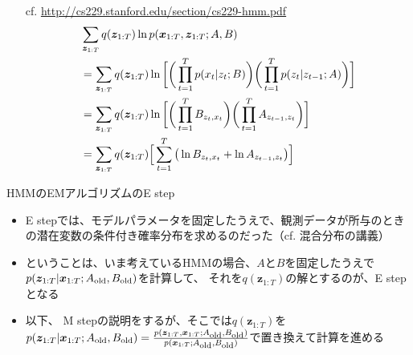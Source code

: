 \documentclass[aspectratio=169,unicode,dvipdfmx,14pt]{beamer}
\begin{document}
\begin{frame}
\begin{itemize}
\item[cf.] \href{http://cs229.stanford.edu/section/cs229-hmm.pdf}{http://cs229.stanford.edu/section/cs229-hmm.pdf}
\begin{align}
& \sum_{\bm{z}_{1:T}} q(\bm{z}_{1:T}) \ln p(\bm{x}_{1:T}, \bm{z}_{1:T};A,B)
\notag \\ &
= \sum_{\bm{z}_{1:T}} q(\bm{z}_{1:T}) \ln \bigg[
\bigg( \prod_{t=1}^T p(x_t|z_t;B) \bigg) \bigg( \prod_{t=1}^T p(z_t|z_{t-1};A) \bigg)\bigg]
\notag \\ &
= \sum_{\bm{z}_{1:T}} q(\bm{z}_{1:T}) \ln \bigg[
\bigg( \prod_{t=1}^T B_{z_t,x_t} \bigg)
\bigg( \prod_{t=1}^T A_{z_{t-1},z_t} \bigg)
\bigg]
\notag \\ &
= \sum_{\bm{z}_{1:T}} q(\bm{z}_{1:T}) \Big[
\sum_{t=1}^T \big( \ln B_{z_t,x_t} + \ln A_{z_{t-1},z_t} \big) \Big]
\end{align}
\end{itemize}
\end{frame}

\begin{frame}{HMMのEMアルゴリズムのE step}
\begin{itemize}
\item E stepでは、モデルパラメータを固定したうえで、観測データが所与のときの潜在変数の条件付き確率分布を求めるのだった（cf. 混合分布の講義）
\item ということは、いま考えているHMMの場合、$A$と$B$を固定したうえで$p(\bm{z}_{1:T} | \bm{x}_{1:T}; A_{\mbox{\scriptsize old}}, B_{\mbox{\scriptsize old}})$を計算して、
それを$q(\bm{z}_{1:T})$の解とするのが、E stepとなる
\item 以下、 M stepの説明をするが、そこでは$q(\bm{z}_{1:T})$を$p(\bm{z}_{1:T} | \bm{x}_{1:T}; A_{\mbox{\scriptsize old}}, B_{\mbox{\scriptsize old}})=\frac{p(\bm{z}_{1:T} , \bm{x}_{1:T}; A_{\mbox{\scriptsize old}}, B_{\mbox{\scriptsize old}})}{p(\bm{x}_{1:T}; A_{\mbox{\scriptsize old}}, B_{\mbox{\scriptsize old}})}$で置き換えて計算を進める
\end{itemize}
\end{frame}
\end{document}
